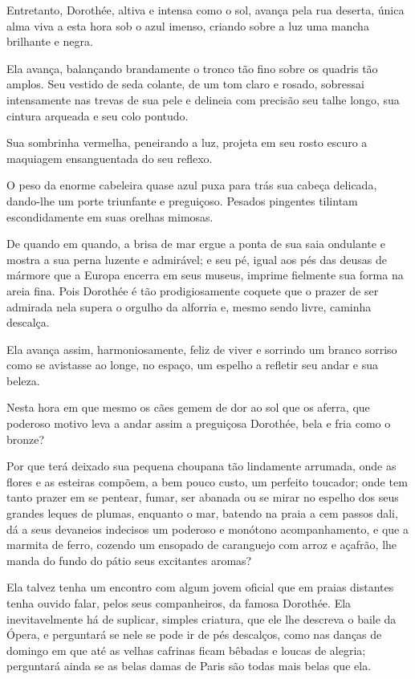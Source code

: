 Entretanto, Dorothée, altiva e intensa como o sol, avança pela rua
deserta, única alma viva a esta hora sob o azul imenso, criando sobre a
luz uma mancha brilhante e negra.

Ela avança, balançando brandamente o tronco tão fino sobre os
quadris tão amplos. Seu vestido de seda colante, de um tom claro e
rosado, sobressai intensamente nas trevas de sua pele e delineia com
precisão seu talhe longo, sua cintura arqueada e seu colo pontudo.

Sua sombrinha vermelha, peneirando a luz, projeta em seu rosto escuro a
maquiagem ensanguentada do seu reflexo.

O peso da enorme cabeleira quase azul puxa para trás sua cabeça
delicada, dando-lhe um porte triunfante e preguiçoso. Pesados pingentes
tilintam escondidamente em suas orelhas mimosas.

De quando em quando, a brisa de mar ergue a ponta de sua saia ondulante e
mostra a sua perna luzente e admirável; e seu pé, igual aos pés das deusas
de mármore que a Europa encerra em seus museus, imprime fielmente sua
forma na areia fina. Pois Dorothée é tão prodigiosamente coquete que o
prazer de ser admirada nela supera o orgulho da alforria e, mesmo sendo
livre, caminha descalça.

Ela avança assim, harmoniosamente, feliz de viver e sorrindo um branco
sorriso como se avistasse ao longe, no espaço, um espelho a refletir
seu andar e sua beleza.

Nesta hora em que mesmo os cães gemem de dor ao sol que os aferra,
que poderoso motivo leva a andar assim a preguiçosa Dorothée, bela e fria
como o bronze?

Por que terá deixado sua pequena choupana tão lindamente arrumada, onde
as flores e as esteiras compõem, a bem pouco custo, um perfeito
toucador; onde tem tanto prazer em se pentear, fumar, ser
abanada ou se  mirar no espelho dos seus grandes leques de plumas,
enquanto o mar, batendo na praia a cem passos dali, dá a seus devaneios
indecisos um poderoso e monótono acompanhamento, e que a marmita de
ferro, cozendo um ensopado de caranguejo com arroz e açafrão, lhe
manda do fundo do pátio seus excitantes aromas?

Ela talvez tenha um encontro com algum jovem oficial que em praias
distantes tenha ouvido falar, pelos seus companheiros, da famosa
Dorothée. Ela inevitavelmente há de suplicar, simples
criatura, que ele lhe descreva o baile da Ópera, e perguntará se
nele se pode ir de pés descalços, como nas danças de domingo em
que até as velhas cafrinas ficam bêbadas e loucas de alegria;
perguntará ainda se as belas damas de Paris são todas mais belas que
ela.

